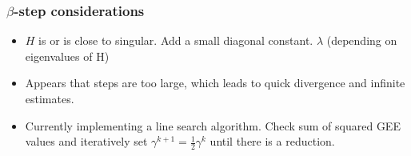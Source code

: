 \documentclass{beamer}
\begin{document}
\begin{frame}
\frametitle{$\beta$-step considerations}
\begin{itemize}
  \item $H$ is or is close to singular. Add a small diagonal constant. $\lambda$
  (depending on eigenvalues of H)
  \item Appears that steps are too large, which leads to quick divergence and infinite estimates.
  \item Currently implementing a line search algorithm. Check sum of squared GEE values and iteratively set $\gamma^{k+1} = \frac{1}{2}\gamma^k$ until there is a reduction.
\end{itemize}
\end{frame}
\end{document}
